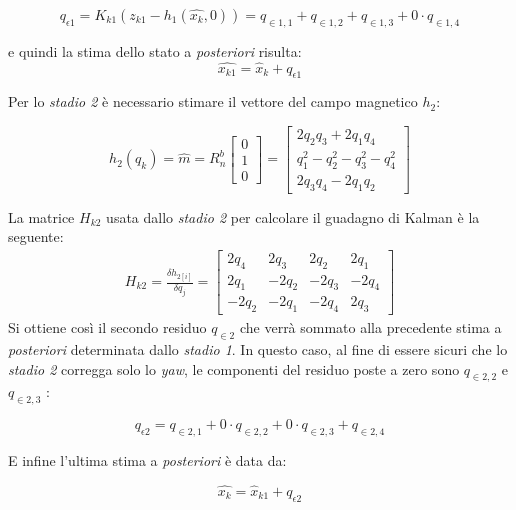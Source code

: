 \begin{equation}
q_{\epsilon 1}= K_{k1}(z_{k1}-h_1(\hat{x_k},0))= q_{\in1,1} + q_{\in1,2} + q_{\in1,3} + 0 \cdot q_{\in1,4} 
\end{equation}

e quindi la stima dello stato a \textit{posteriori} risulta:
\begin{equation}
\hat{x_{k1}} = \hat{x}_k + q_{\epsilon 1}
\end{equation}

Per lo \textit{stadio 2} è necessario stimare il vettore del campo magnetico $h_2$:

\begin{equation}
h_2(q_k) = \hat{m} = R_n^b \begin{bmatrix}
0 \\
1 \\
0
\end{bmatrix} = 
\begin{bmatrix}
2q_2q_3 + 2q_1q_4 \\
q_1^2 - q_2^2 - q_3^2 - q_4^2 \\
2q_3q_4 - 2q_1q_2
\end{bmatrix} 
\end{equation}

La matrice $H_{k2}$ usata dallo \textit{stadio 2} per calcolare il guadagno di Kalman è la seguente:
\begin{eqnarray}
H_{k2}= \frac{\delta h_{2[i]}}{\delta q_j}=  \begin{bmatrix}
2q_4 & 2q_3 & 2q_2 & 2q_1  \\
2q_1 & -2q_2 & -2q_3 & -2q_4\\
-2q_2 & -2q_1 & -2q_4 & 2q_3
\end{bmatrix}
\end{eqnarray}  
Si ottiene così il secondo residuo $q_{\in 2}$ che verrà sommato alla precedente stima a \textit{posteriori} determinata dallo \textit{stadio 1}. In questo caso, al fine di essere sicuri che lo \textit{stadio 2} corregga solo lo \textit{yaw}, le componenti del residuo poste a zero sono $q_{\in 2,2}$ e $q_{\in 2,3}$ :

\begin{equation}
q_{\epsilon 2}= q_{\in2,1} + 0 \cdot q_{\in2,2} + 0 \cdot q_{\in2,3} + q_{\in2,4} 
\end{equation}

E infine l'ultima stima a \textit{posteriori} è data da:

\begin{equation}
\hat{x_{k}} = \hat{x}_{k1} + q_{\epsilon 2}
\end{equation}


